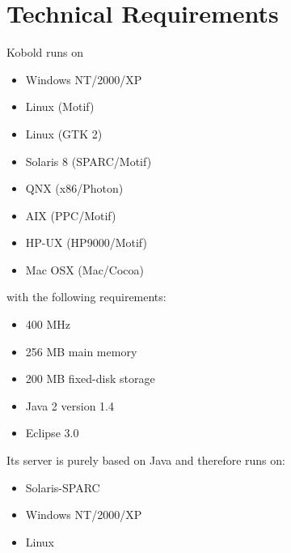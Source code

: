 \chapter{Technical Requirements}

Kobold runs on 

\begin{itemize}
\item Windows NT/2000/XP
\item Linux (Motif)
\item Linux (GTK 2)
\item Solaris 8 (SPARC/Motif)
\item QNX (x86/Photon)
\item AIX (PPC/Motif)
\item HP-UX (HP9000/Motif)
\item Mac OSX (Mac/Cocoa)
\end{itemize}

with the following requirements: \par

\begin{itemize}
\item 400 MHz
\item 256 MB main memory
\item 200 MB fixed-disk storage
\item Java 2 version 1.4
\item Eclipse 3.0
\end{itemize}
\par
\par

Its server is purely based on Java and therefore runs on:
\begin{itemize}
\item Solaris-SPARC
\item Windows NT/2000/XP
\item Linux
\end{itemize}
